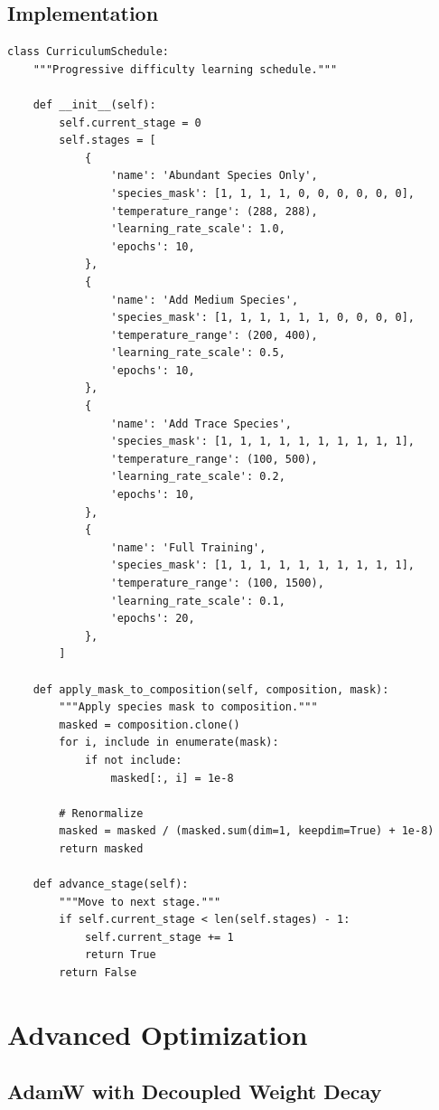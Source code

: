\documentclass[12pt,a4paper,oneside]{report}
\begin{document}
\subsection{Implementation}

\begin{lstlisting}
class CurriculumSchedule:
    """Progressive difficulty learning schedule."""

    def __init__(self):
        self.current_stage = 0
        self.stages = [
            {
                'name': 'Abundant Species Only',
                'species_mask': [1, 1, 1, 1, 0, 0, 0, 0, 0, 0],
                'temperature_range': (288, 288),
                'learning_rate_scale': 1.0,
                'epochs': 10,
            },
            {
                'name': 'Add Medium Species',
                'species_mask': [1, 1, 1, 1, 1, 1, 0, 0, 0, 0],
                'temperature_range': (200, 400),
                'learning_rate_scale': 0.5,
                'epochs': 10,
            },
            {
                'name': 'Add Trace Species',
                'species_mask': [1, 1, 1, 1, 1, 1, 1, 1, 1, 1],
                'temperature_range': (100, 500),
                'learning_rate_scale': 0.2,
                'epochs': 10,
            },
            {
                'name': 'Full Training',
                'species_mask': [1, 1, 1, 1, 1, 1, 1, 1, 1, 1],
                'temperature_range': (100, 1500),
                'learning_rate_scale': 0.1,
                'epochs': 20,
            },
        ]

    def apply_mask_to_composition(self, composition, mask):
        """Apply species mask to composition."""
        masked = composition.clone()
        for i, include in enumerate(mask):
            if not include:
                masked[:, i] = 1e-8

        # Renormalize
        masked = masked / (masked.sum(dim=1, keepdim=True) + 1e-8)
        return masked

    def advance_stage(self):
        """Move to next stage."""
        if self.current_stage < len(self.stages) - 1:
            self.current_stage += 1
            return True
        return False
\end{lstlisting}

\section{Advanced Optimization}

\subsection{AdamW with Decoupled Weight Decay}
\end{document}
